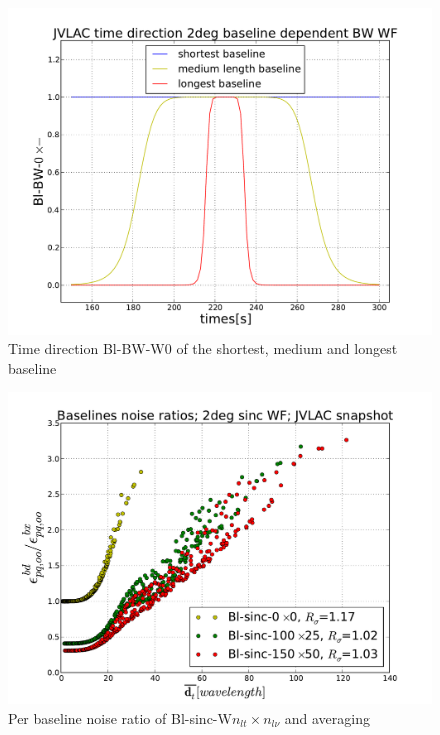 \documentclass[useAMS,usenatbib]{mn2e}
\begin{document}
\begin{figure}
  \begin{minipage}{0.38\linewidth}\includegraphics[width=1\textwidth]{./Figures/longshortmid-butter.pdf}\\
  \caption{Time direction Bl-BW-W0 of the shortest, medium and longest baseline}\label{fig:longshortmid-butter}
  \end{minipage}
    \begin{minipage}{0.38\linewidth}\includegraphics[width=1\textwidth]{./Figures/per-baseline-noise-ratio-sinc.pdf}
  \caption{Per baseline noise ratio of Bl-sinc-W$n_{lt}\times n_{l\nu}$ and averaging}\label{fig:per-baseline-noise-ratio-sinc}

\end{minipage}
\end{figure}
\end{document}
